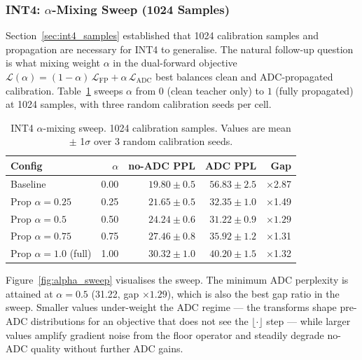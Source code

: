 \documentclass[a4paper,11pt,oneside]{article}
\theoremstyle{breakstyle}
\begin{document}
  \subsubsection{INT4: $\alpha$-Mixing Sweep (1024 Samples)}
  \label{sec:alpha_sweep}

  Section~\ref{sec:int4_samples} established that 1024 calibration
  samples and propagation are necessary for INT4 to generalise.  The
  natural follow-up question is what mixing weight $\alpha$ in the
  dual-forward objective
  $\mathcal{L}(\alpha) = (1{-}\alpha)\,\mathcal{L}_{\mathrm{FP}}
  + \alpha\,\mathcal{L}_{\mathrm{ADC}}$ best balances clean and
  ADC-propagated calibration.  Table~\ref{tab:int4v2} sweeps $\alpha$
  from $0$ (clean teacher only) to $1$ (fully propagated) at
  1024 samples, with three random calibration seeds per cell.

  \begin{table}[htbp]
    \centering
    \caption{INT4 $\alpha$-mixing sweep. 1024 calibration samples. Values are
             mean $\pm$ 1$\sigma$ over 3 random calibration seeds.}
    \label{tab:int4v2}
    \renewcommand{\arraystretch}{1.15}
    \begin{tabular}{@{}lrrrr@{}}
      \toprule
      \textbf{Config} & \textbf{$\alpha$} & \textbf{no-ADC PPL} & \textbf{ADC PPL} & \textbf{Gap} \\
      \midrule
      Baseline                  & 0.00 & $19.80\pm0.5$ & $56.83\pm2.5$ & $\times$2.87 \\
      Prop $\alpha=0.25$        & 0.25 & $21.65\pm0.5$ & $32.35\pm1.0$ & $\times$1.49 \\
      Prop $\alpha=0.5$         & 0.50 & $24.24\pm0.6$ & $\mathbf{31.22\pm0.9}$ & $\mathbf{\times 1.29}$ \\
      Prop $\alpha=0.75$        & 0.75 & $27.46\pm0.8$ & $35.92\pm1.2$ & $\times$1.31 \\
      Prop $\alpha=1.0$ (full)  & 1.00 & $30.32\pm1.0$ & $40.20\pm1.5$ & $\times$1.32 \\
      \bottomrule
    \end{tabular}
  \end{table}

  Figure~\ref{fig:alpha_sweep} visualises the sweep.  The minimum
  ADC perplexity is attained at $\alpha = 0.5$ (31.22, gap
  $\times 1.29$), which is also the best gap ratio in the sweep.
  Smaller values under-weight the ADC regime --- the transforms
  shape pre-ADC distributions for an objective that does not see the
  $\lfloor \cdot \rfloor$ step --- while larger values amplify
  gradient noise from the floor operator and steadily degrade no-ADC
  quality without further ADC gains.
\end{document}
